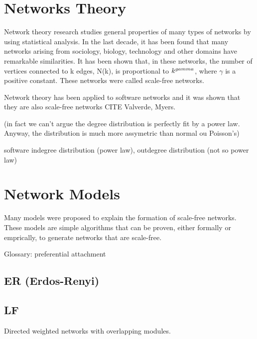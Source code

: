 \section{Networks Theory}

Network theory research studies general properties of many types of networks by
using statistical analysis. In the last decade, it has been found that many
networks arising from sociology, biology, technology and other domains have
remarkable similarities. It has been shown that, in these networks, the number
of vertices connected to k edges, N(k), is proportional to $k^{\-gamma}$, where
$\gamma$ is a positive constant. These networks were called scale-free networks.

Network theory has been applied to software networks and it was shown that they
are also scale-free networks CITE Valverde, Myers.

(in fact we can't argue the degree distribution is perfectly fit by a power law.
Anyway, the distribution is much more assymetric than normal ou Poisson's)

software indegree distribution (power law), outdegree distribution (not so power
law)

\section{Network Models}

Many models were proposed to explain the formation of scale-free networks. These
models are simple algorithms that can be proven, either formally or emprically,
to generate networks that are scale-free.


Glossary: preferential attachment

\subsection{ER (Erdos-Renyi)}


\subsection{LF}

Directed weighted networks with overlapping modules.

